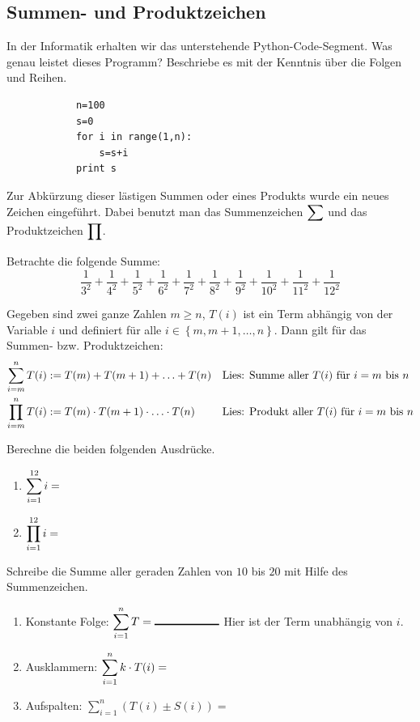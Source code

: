 \documentclass[11pt,oneside]{article}
\begin{document}
\subsection{Summen- und Produktzeichen}
	\vspace{7pt}
	\begin{aufgabe}
		In der Informatik erhalten wir das unterstehende Python-Code-Segment. Was genau leistet dieses Programm? Beschriebe es mit der Kenntnis über die Folgen und Reihen.
		\begin{lstlisting}
			n=100
			s=0
			for i in range(1,n):
				s=s+i
			print s
		\end{lstlisting}
	\end{aufgabe}
	Zur Abkürzung dieser lästigen Summen oder eines Produkts wurde ein neues Zeichen eingeführt. Dabei benutzt man das Summenzeichen $\displaystyle\sum$ und das Produktzeichen $\displaystyle\prod$.
	\begin{beispiel}
		Betrachte die folgende Summe: \[\frac{1}{3^2}+\frac{1}{4^2}+\frac{1}{5^2}+\frac{1}{6^2}+\frac{1}{7^2}+\frac{1}{8^2}+\frac{1}{9^2}+\frac{1}{10^2}+\frac{1}{11^2}+\frac{1}{12^2}\]
	\end{beispiel}
	\begin{definition}
		Gegeben sind zwei ganze Zahlen $m\geq n$, $T(i)$ ist ein Term abhängig von der Variable $i$ und definiert für alle $i\in\left\{m,m+1,\ldots,n\right\}$. Dann gilt für das Summen- bzw. Produktzeichen:
		\begin{align*}
			\sum_{i=m}^n T(i)&:=T(m)+T(m+1)+\ldots+T(n) && \text{Lies: Summe aller $T(i)$ für $i=m$ bis $n$}\\
			\prod_{i=m}^n T(i)&:=T(m)\cdot T(m+1)\cdot\ldots\cdot T(n) && \text{Lies: Produkt aller $T(i)$ für $i=m$ bis $n$}
		\end{align*}
	\end{definition}
	\begin{beispiel}
		Berechne die beiden folgenden Ausdrücke.
		\begin{enumerate}[label=\ ]
			\item $\displaystyle\sum_{i=1}^{12} i=$
			\item $\displaystyle\prod_{i=1}^{12} i=$
		\end{enumerate}
		Schreibe die Summe aller geraden Zahlen von $10$ bis $20$ mit Hilfe des Summenzeichen.\\[5pt]\karos{2.5}
	\end{beispiel}
	\begin{satz}[Rechenregeln]
		\begin{enumerate}
			\item Konstante Folge: $\displaystyle\sum_{i=1}^n T=\gap{2}$\hspace{48pt} Hier ist der Term unabhängig von $i$.
			\item Ausklammern: $\displaystyle\sum_{i=1}^n k\cdot T(i)=$
			\item Aufspalten: $\displaystyle\sum_{i=1}^n\left(T(i)\pm S(i)\right)=$
		\end{enumerate}
	\end{satz}
\end{document}
